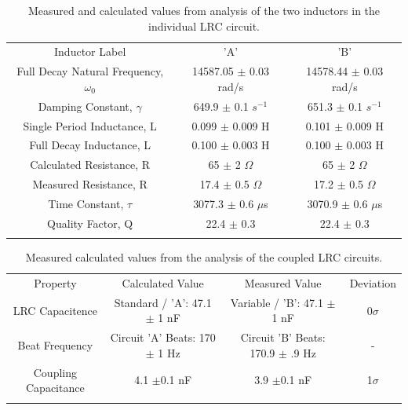 \documentclass[aps,prl,reprint]{revtex4-2}
\begin{document}
\newpage
\begin{widetext}
\begin{center}
\begin{table}[h]
\renewcommand{\arraystretch}{1.35}
\setlength{\tabcolsep}{10pt}
\caption{\label{DONE BITCH}Measured and calculated values from analysis of the two inductors in the individual LRC circuit.}
\begin{tabular}{|c|c|c|}
\toprule
Inductor Label & 'A' & 'B'\\
\colrule
Full Decay Natural Frequency, $\omega_0$ & 14587.05  $\pm$ 0.03 rad/s & 14578.44 $\pm$ 0.03 rad/s \\
\colrule
Damping Constant, $\gamma$ & 649.9 $\pm$ 0.1  $s^{-1}$ & 651.3 $\pm$ 0.1  $s^{-1}$  \\
\colrule
Single Period Inductance, L & 0.099 $\pm$ 0.009 H &  0.101 $\pm$ 0.009 H\\
\colrule
Full Decay Inductance, L & 0.100 $\pm$ 0.003 H & 0.100 $\pm$ 0.003 H \\
\colrule
Calculated Resistance, R & 65 $\pm$ 2 $\Omega$ & 65 $\pm$ 2 $\Omega$ \\
\colrule
Measured Resistance, R & 17.4 $\pm$ 0.5 $\Omega$ & 17.2 $\pm$ 0.5 $\Omega$ \\
\colrule
Time Constant, $\tau$ & 3077.3 $\pm$ 0.6 $\mu$s & 3070.9 $\pm$ 0.6 $\mu$s\\
\colrule
Quality Factor, Q & 22.4 $\pm$ 0.3 & 22.4 $\pm$ 0.3\\
\botrule
\end{tabular}
\end{table}

\begin{table}[h]
\renewcommand{\arraystretch}{1.35}
\setlength{\tabcolsep}{10pt}
\caption{\label{DONE BITCH 2}Measured calculated values from the analysis of the coupled LRC circuits.}
\begin{tabular}{|c|c|c|c|}
\toprule
Property & Calculated Value & Measured Value & Deviation \\
\colrule
LRC Capacitence & Standard / 'A': 47.1 $\pm$ 1 nF & Variable / 'B': 47.1 $\pm$ 1 nF & 0$\sigma$\\
\colrule
Beat Frequency & Circuit 'A' Beats: 170 $\pm$ 1 Hz & Circuit 'B' Beats: 170.9 $\pm$ .9 Hz & - \\
\colrule
Coupling Capacitance &  4.1 $\pm$0.1 nF & 3.9 $\pm$0.1 nF & 1$\sigma$\\


\botrule
\end{tabular}
\end{table}
\end{center}
\end{widetext}
\end{document}
